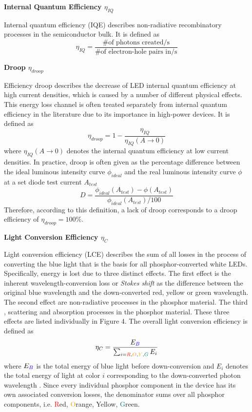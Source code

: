 \documentclass[parskip=full]{article}
\begin{document}
\textbf{Internal Quantum Efficiency $\eta_{IQ}$}

Internal quantum efficiency (IQE) describes non-radiative recombinatory processes in the semiconductor bulk. It is defined as
%
\begin{equation}
    \eta_{IQ} = \frac{\# \text{of photons created/s}}{\# \text{of electron-hole pairs in/s}}
\end{equation}

\textbf{Droop $\eta_{droop}$}

Efficiency droop describes the decrease of LED internal quantum efficiency at high current densities, which is caused by a number of different physical effects\cite{David2020}. This energy loss channel is often treated separately from internal quantum efficiency in the literature due to its importance in high-power devices. It is defined as
%
\begin{equation}
    \eta_{droop} = 1 - \frac{\eta_{IQ}}{\eta_{IQ}(A \rightarrow 0)}
\end{equation}
%
where $\eta_{IQ}(A \rightarrow 0)$ denotes the internal quantum efficiency at low current densities. In practice, droop is often given as the percentage difference between the ideal luminous intensity curve $\phi_{ideal}$ and the real luminous intensity curve $\phi$ at a set diode test current $A_{test}$
%
\begin{equation}
\label{eqn:droop}
    D = \frac{\phi_{ideal}(A_{test})-\phi(A_{test})}{\phi_{ideal}(A_{test})/100}
\end{equation}
%
Therefore, according to this definition, a lack of droop corresponds to a droop efficiency of $\eta_{droop} = 100\%$\cite{schubert2018light}\cite{tsao2010solid}.

\textbf{Light Conversion Efficiency $\eta_{C}$}

Light conversion efficiency (LCE) describes the sum of all losses in the process of converting the blue light that is the basis for all phosphor-converted white LEDs. Specifically, energy is lost due to three distinct effects. The first effect is the inherent wavelength-conversion loss or \textit{Stokes shift} as the difference between the original blue wavelength and the down-converted red, yellow or green wavelength. The second effect are non-radiative processes in the phosphor material. The third , scattering and absorption processes in the phosphor material. These three effects are listed individually in Figure 4. The overall light conversion efficiency is defined as
%
\begin{equation}
    \eta_{C} = \frac{E_{\textcolor{blue}{B}}}{\sum_{i=\textcolor{red}{R},\textcolor{orange}{O},\textcolor[RGB]{225, 180, 0}{Y},\textcolor{teal}{G}} E_i}
\end{equation}
%
where $E_{\textcolor{blue}{B}}$ is the total energy of blue light before down-conversion and $E_i$ denotes the total energy of light at color $i$ corresponding to the down-converted photon wavelength \cite{schubert2018light}\cite{tsao2010solid}. Since every individual phosphor component in the device has its own associated conversion losses, the denominator sums over all phosphor components, i.e. \textcolor{red}{R}ed, \textcolor{orange}{O}range, \textcolor[RGB]{225, 180, 0}{Y}ellow, \textcolor{teal}{G}reen.
\end{document}
